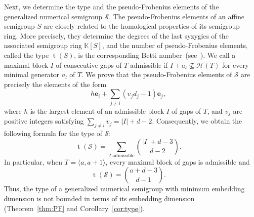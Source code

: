 \documentclass[12pt]{amsart}
\theoremstyle{plain}
\theoremstyle{theorem}
\theoremstyle{remark}
\begin{document}
Next, we determine the type and the pseudo-Frobenius elements of the generalized numerical semigroup $\mathcal{S}$. The pseudo-Frobenius elements of an affine semigroup $S$ are closely related to the homological properties of its semigroup ring. More precisely, they determine the degrees of the last syzygies of the associated semigroup ring $\mathbb{K}[S]$, and the number of pseudo-Frobenius elements, called the type $\operatorname{t}(S)$, is the corresponding Betti number~(see~\cite{garcia-pseudofrobenius}). We call a maximal block $I$ of consecutive gaps of $T$ admissible if $I+a_l\not\subseteq \mathcal{H}(T)$ for every minimal generator $a_l$ of $T$. We prove that the pseudo-Frobenius elements of $\mathcal{S}$ are precisely the elements of the form
$$h\mathbf{e}_i+\sum_{j\neq i}(v_jd_j-1)\mathbf{e}_j,$$ 
where $h$ is the largest element of an admissible block $I$ of gaps of $T$, and $v_j$ are positive integers satisfying $\sum_{j\neq i}v_j=|I|+d-2.$ Consequently, we obtain the following formula for the type of $\mathcal{S}$:
$$\operatorname{t}(\mathcal{S})=\sum_{I\text{ admissible}}
\binom{|I|+d-3}{d-2}.$$
In particular, when $T=\langle a,a+1\rangle$, every maximal block of gaps is admissible and
$$ \operatorname{t}(\mathcal{S})=\binom{a+d-3}{d-1}.$$
Thus, the type of a generalized numerical semigroup with minimum embedding dimension is not bounded in terms of its embedding dimension (Theorem~\ref{thm:PF} and Corollary~\ref{cor:type}).
\end{document}
